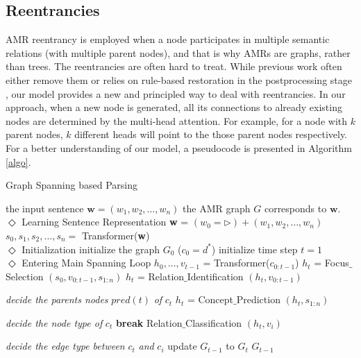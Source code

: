 \documentclass[11pt,a4paper]{article}
\begin{document}
	\subsection{Reentrancies}
    \noindent AMR reentrancy is employed when a node participates in multiple semantic relations (with multiple parent nodes), and that is why AMRs are graphs, rather than trees. The reentrancies are often hard to treat. While previous work often either remove them \cite{guo2018better} or relies on rule-based restoration in the postprocessing stage \cite{lyu2018amr,van2017neural}, our model provides a new and principled way to deal with reentrancies. In our approach, when a new node is generated, all its connections to already existing nodes are determined by the multi-head attention. For example, for a node with $k$ parent nodes, $k$ different heads will point to the those parent nodes respectively. For a better understanding of our model, a pseudocode is presented in Algorithm \ref{algo}.
    	 \begin{algorithm}[t]
    	\caption{Graph Spanning based Parsing}
    	\begin{algorithmic}[1]
    		\REQUIRE the input sentence $\mathbf{w}= (w_1, w_2, \ldots, w_n)$
    		\ENSURE the AMR graph $G$ corresponds to $\mathbf{w}$.\\
    		$\Diamond$ Learning Sentence Representation
    		\STATE \textbf{w} = $(w_0 = \rhd) + (w_1, w_2, \ldots, w_n)$
    		\STATE $s_0, s_1, s_2, \ldots, s_n = $ Transformer(\textbf{w})\\
    		$\Diamond$ Initialization
    		\STATE initialize the graph $G_0$ ($c_0=d^*$)
    		\STATE initialize time step $t =1$\\
    		$\Diamond$ Entering Main Spanning Loop
    		\STATE $h_0, \ldots, v_{t-1}$ = Transformer($c_{0:t-1}$)
    		\STATE $h_t$ = Focus$\_$Selection $(s_0, v_{0:{t-1}}, s_{1:n})$
    		\STATE $h_t$ = Relation$\_$Identification $(h_t, v_{0:{t-1}})$
    		\item \textit{decide the parents nodes} $pred(t)$ \textit{of} $c_t$
    		\STATE $h_t$ = Concept$\_$Prediction $(h_t, s_{1:n})$
    		\item \textit{decide the node type of }$c_t$
    		\STATE \textbf{break}
    		\ENDIF
    		\STATE Relation$\_$Classification $(h_t, v_i)$
    		\item \textit{decide the edge type between} $c_t$ \textit{and} $c_i$
    		\ENDFOR
    		\STATE update $G_{t-1}$ to $G_t$
    		\ENDWHILE
    		\RETURN $G_{t-1}$
    	\end{algorithmic}
    	\label{algo}
    \end{algorithm}
\end{document}
